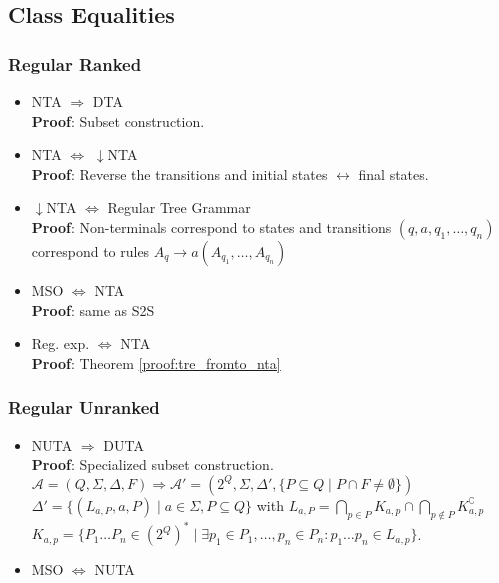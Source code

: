 \documentclass{article}
\begin{document}
\subsection{Class Equalities}
\subsubsection{Regular Ranked}
\begin{itemize}
	\item NTA $\Rightarrow$ DTA \\
		\textbf{Proof}: Subset construction.
	\item NTA $\Leftrightarrow$ $\downarrow$NTA \\
		\textbf{Proof}: Reverse the transitions and initial states $\leftrightarrow$ final states.
	\item $\downarrow$NTA $\Leftrightarrow$ Regular Tree Grammar \\
		\textbf{Proof}: Non-terminals correspond to states and transitions $(q, a, q_1, \dots, q_n)$ correspond to rules $A_q \rightarrow a(A_{q_1}, \dots, A_{q_n})$
	\item MSO $\Leftrightarrow$ NTA \\
		\textbf{Proof}: same as S2S
	\item Reg. exp. $\Leftrightarrow$ NTA \\
		\textbf{Proof}: Theorem \ref{proof:tre_fromto_nta}
\end{itemize}

\subsubsection{Regular Unranked}
\begin{itemize}
	\item NUTA $\Rightarrow$ DUTA \\
		\textbf{Proof}: Specialized subset construction. \\
		$\mathcal{A} = (Q, \Sigma, \Delta, F) \Rightarrow \mathcal{A}' = (2^Q, \Sigma, \Delta', \{P \subseteq Q \mid P \cap F \neq \emptyset\})$ \\
		$\Delta' = \{(L_{a,P}, a, P) \mid a \in \Sigma, P \subseteq Q\}$ with $L_{a,P} = \bigcap\limits_{p \in P} K_{a,p} \cap \bigcap\limits_{p \notin P} K_{a,p}^\complement$ \\
		$K_{a,p} = \{ P_1 \dots P_n \in (2^Q)^* \mid \exists p_1 \in P_1, \dots, p_n \in P_n: p_1 \dots p_n \in L_{a,p} \}$.
	\item MSO $\Leftrightarrow$ NUTA %
\end{itemize}
\end{document}
